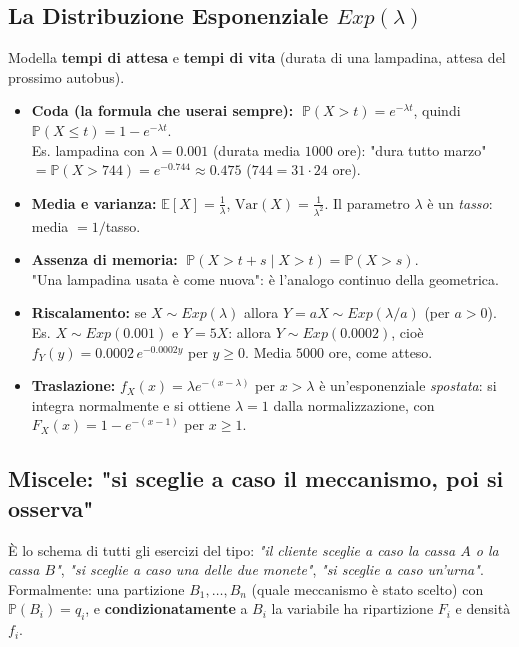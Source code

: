 \documentclass[12pt]{extarticle} %
\begin{document}
\subsection{La Distribuzione Esponenziale $Exp(\lambda)$}
Modella \textbf{tempi di attesa} e \textbf{tempi di vita} (durata di una lampadina, attesa del prossimo autobus).
\begin{itemize}
    \item \textbf{Coda (la formula che userai sempre):} $\;\mathbb{P}(X > t) = e^{-\lambda t}$, \; quindi $\mathbb{P}(X \le t) = 1 - e^{-\lambda t}$. \\ {\footnotesize Es. lampadina con $\lambda = 0.001$ (durata media $1000$ ore): "dura tutto marzo" $= \mathbb{P}(X > 744) = e^{-0.744} \approx 0.475$ \; ($744 = 31 \cdot 24$ ore).}
    \item \textbf{Media e varianza:} $\mathbb{E}[X] = \frac1\lambda$, $\mathrm{Var}(X) = \frac{1}{\lambda^2}$. {\footnotesize Il parametro $\lambda$ è un \emph{tasso}: media $=1/$tasso.}
    \item \textbf{Assenza di memoria:} $\;\mathbb{P}(X > t+s \mid X > t) = \mathbb{P}(X > s)$. \\ {\footnotesize "Una lampadina usata è come nuova": è l'analogo continuo della geometrica.}
    \item \textbf{Riscalamento:} se $X \sim Exp(\lambda)$ allora $Y = aX \sim Exp(\lambda/a)$ (per $a > 0$). \\ {\footnotesize Es. $X \sim Exp(0.001)$ e $Y = 5X$: allora $Y \sim Exp(0.0002)$, cioè $f_Y(y) = 0.0002\,e^{-0.0002y}$ per $y \ge 0$. Media $5000$ ore, come atteso.}
    \item \textbf{Traslazione:} $f_X(x) = \lambda e^{-(x-\lambda)}$ per $x > \lambda$ è un'esponenziale \emph{spostata}: si integra normalmente e si ottiene $\lambda = 1$ dalla normalizzazione, con $F_X(x) = 1 - e^{-(x-1)}$ per $x \ge 1$.
\end{itemize}

\newpage
\subsection{Miscele: "si sceglie a caso il meccanismo, poi si osserva"}
È lo schema di tutti gli esercizi del tipo: \emph{"il cliente sceglie a caso la cassa $A$ o la cassa $B$"}, \emph{"si sceglie a caso una delle due monete"}, \emph{"si sceglie a caso un'urna"}. Formalmente: una partizione $B_1,\dots,B_n$ (quale meccanismo è stato scelto) con $\mathbb{P}(B_i) = q_i$, e \textbf{condizionatamente} a $B_i$ la variabile ha ripartizione $F_i$ e densità $f_i$.
\end{document}

